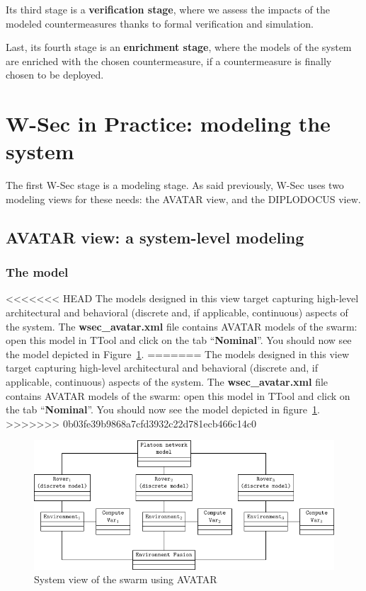 \documentclass{article}
\begin{document}
Its third stage is a \textbf{verification stage}, where we assess the impacts of the modeled countermeasures thanks to formal verification and simulation.

Last, its fourth stage is an \textbf{enrichment stage}, where the models of the system are enriched with the chosen countermeasure, if a countermeasure is finally chosen to be deployed.


\section{W-Sec in Practice: modeling the system}

The first W-Sec stage is a modeling stage. As said previously, W-Sec uses two modeling views for these needs: the AVATAR view, and the DIPLODOCUS view.

\subsection{AVATAR view: a system-level modeling}

\subsubsection{The model}

<<<<<<< HEAD
The models designed in this view target capturing high-level architectural and behavioral (discrete and, if applicable, continuous) aspects of the system. The \textbf{wsec\_avatar.xml} file contains AVATAR models of the swarm: open this model in TTool and click on the tab ``\textbf{Nominal}''. You should now see the model depicted in Figure~\ref{fig:avatarmodel}.
=======
The models designed in this view target capturing high-level architectural and behavioral (discrete and, if applicable, continuous) aspects of the system. The \textbf{wsec\_avatar.xml} file contains AVATAR models of the swarm: open this model in TTool and click on the tab ``\textbf{Nominal}''. You should now see the model depicted in figure~\ref{fig:avatarmodel}.
>>>>>>> 0b03fe39b9868a7cfd3932c22d781ecb466c14c0

\begin{figure}
	\centering
	\includegraphics{figures/avatarmodel.pdf}
	\caption{System view of the swarm using AVATAR}
	\label{fig:avatarmodel}
\end{figure}
\end{document}
